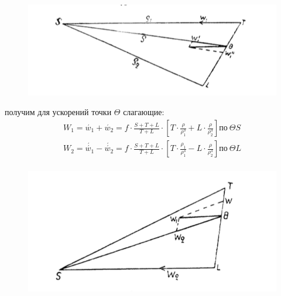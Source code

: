 \documentclass[a4paper,12pt]{article}
\begin{document}
\begin{figure}[h!]
    \centering
    \includegraphics{22.png}
    \caption{}
    \label{fig:22}
\end{figure}
получим для ускорений точки $\Theta$ слагающие:
\begin{equation*}
    \begin{aligned}
        W_1 = \acute{w_1} + \acute{w_2} = f\cdot\frac{S + T + L}{T + L}\cdot \left[T\cdot \frac{\rho}{\rho_{1}^3} + L\cdot\frac{\rho}{\rho_{2}^3}\right] по\:\Theta S\\
        W_2 = \acute{\acute{w_1}} - \acute{\acute{w_2}} = f\cdot\frac{S + T + L}{T + L}\cdot \left[T\cdot \frac{\rho_1}{\rho_{1}^3} - L\cdot\frac{\rho}{\rho_{2}^3}\right] по\: \Theta L\\
    \end{aligned}
\end{equation*}

\begin{figure}
    \centering
    \includegraphics[scale = 0.5]{23.png}
    \caption{}
    \label{fig:23}
\end{figure}
\end{document}
